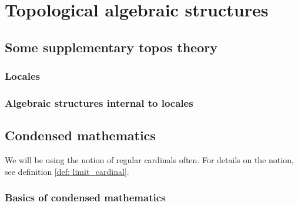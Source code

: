 \chapter{Topological algebraic structures}
    \begin{abstract}
        
    \end{abstract}
    
    \minitoc
    
    \section{Some supplementary topos theory}
        \subsection{Locales}
        
        \subsection{Algebraic structures internal to locales}
    
    \section{Condensed mathematics} \label{section: condensed_mathematics}
        \begin{remark}
            We will be using the notion of regular cardinals often. For details on the notion, see definition \ref{def: limit_cardinal}.
        \end{remark}
    
        \subsection{Basics of condensed mathematics}
